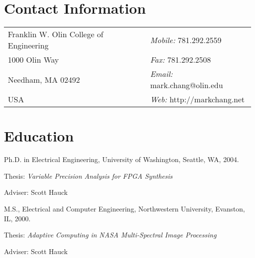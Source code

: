 \documentclass[line]{res}
\newenvironment{list1}{
  \begin{list}{\ding{113}}{%
      \setlength{\itemsep}{0in}
      \setlength{\parsep}{0in} \setlength{\parskip}{0in}
      \setlength{\topsep}{0in} \setlength{\partopsep}{0in} 
      \setlength{\leftmargin}{0.17in}}}{\end{list}}
\begin{document}

\begin{resume}
	
	\section{\sc Contact Information} \vspace{0.05in} 
	\begin{tabular}
		{@{}p{3in}p{2.5in}} Franklin W. Olin College of Engineering & {\em Mobile:} 781.292.2559 \\
		1000 Olin Way & {\em Fax:} 781.292.2508 \\
		Needham, MA 02492 & {\em Email:} mark.chang@olin.edu \\
		USA & {\em Web:} http://markchang.net \\
	\end{tabular}
	
	\section{\sc Education}
	\begin{enumerate}
		\item Ph.D. in Electrical Engineering, University of Washington, Seattle, WA, 2004.\\
		\vspace*{-.1in} 
		\begin{list1}
			\item[] Thesis: {\em Variable Precision Analysis for FPGA Synthesis} 
			\item[] Adviser: Scott Hauck 
		\end{list1}
		
		\item M.S., Electrical and Computer Engineering, Northwestern University, Evanston, IL, 2000.\\
		\vspace*{-.1in} 
		\begin{list1}
			\item[] Thesis: {\em Adaptive Computing in NASA Multi-Spectral Image Processing} 
			\item[] Adviser: Scott Hauck 
		\end{list1}
		

\end{enumerate}
\end{resume}
\end{document}
